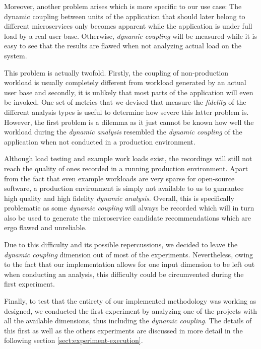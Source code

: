 \documentclass[12pt,a4paper]{report}
\begin{document}
Moreover, another problem arises which is more specific to
our use case: The dynamic coupling between units of the application that should
later belong to different microservices only becomes apparent while the application
is under full load by a real user base.
Otherwise, \textit{dynamic coupling} will be measured while it is easy to see
that the results are flawed when not analyzing actual load on the system.

This problem is actually twofold. Firstly, the coupling of non-production workload
is usually completely different from workload generated by an actual user base and
secondly, it is unlikely that most parts of the application will even be invoked.
One set of metrics that we devised that measure the \textit{fidelity} of the
different analysis types is useful to determine how severe this latter problem is.
However, the first problem is a dilemma as it just cannot be known how well the
workload during the \textit{dynamic analysis} resembled the \textit{dynamic coupling}
of the application when not conducted in a production environment.

Although load testing and example work loads exist, the recordings will still
not reach the quality of ones recorded in a running production environment.
Apart from the fact that even example workloads are very sparse for open-source
software, a production environment is simply not available to us to guarantee
high quality and high fidelity \textit{dynamic analysis}.
Overall, this is specifically problematic as some \textit{dynamic coupling} will always
be recorded which will in turn also be used to generate the microservice candidate
recommendations which are ergo flawed and unreliable.

Due to this difficulty and its possible repercussions, we decided to leave the
\textit{dynamic coupling} dimension out of most of the experiments.
Nevertheless, owing to the fact that our implementation allows for one input dimension
to be left out when conducting an analysis, this difficulty could be circumvented
during the first experiment.

Finally, to test that the entirety of our implemented methodology was working as designed,
we conducted the first experiment by analyzing one of the projects with all the available
dimensions, thus including the \textit{dynamic coupling}. The details of this first as
well as the others experiments are discussed in more detail in the following section
\ref{sect:experiment-execution}.
\end{document}
